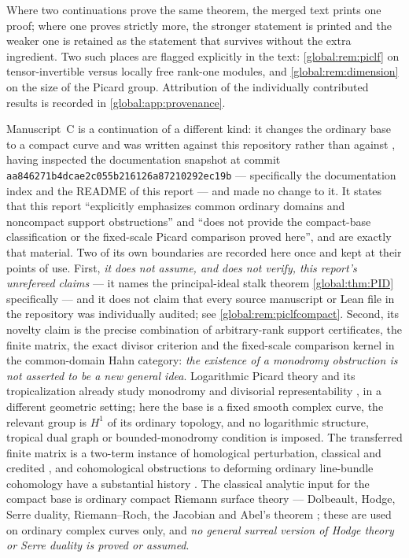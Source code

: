 \documentclass[11pt,letterpaper]{article}
\theoremstyle{definition}
\theoremstyle{remark}
\numberwithin{equation}{section}
\begin{document}
Where two continuations prove the same theorem, the merged text prints one proof; where one proves strictly more, the stronger statement is printed and the weaker one is retained as the statement that survives without the extra ingredient. Two such places are flagged explicitly in the text: \cref{global:rem:piclf} on tensor-invertible versus locally free rank-one modules, and \cref{global:rem:dimension} on the size of the Picard group. Attribution of the individually contributed results is recorded in \cref{global:app:provenance}.

Manuscript~C is a continuation of a different kind: it changes the ordinary base to a compact curve and was written against this repository rather than against \cite{Source}, having inspected the documentation snapshot at commit
\texttt{aa846271\allowbreak b4dcae2c\allowbreak 055b2161\allowbreak 26a87210\allowbreak 292ec19b}
--- specifically the documentation index and the README of this report --- and made no change to it. It states that this report ``explicitly emphasizes common ordinary domains and noncompact support obstructions'' and ``does not provide the compact-base classification or the fixed-scale Picard comparison proved here'', and  are exactly that material. Two of its own boundaries are recorded here once and kept at their points of use. First, \emph{it does not assume, and does not verify, this report's unrefereed claims} --- it names the principal-ideal stalk theorem \cref{global:thm:PID} specifically --- and it does not claim that every source manuscript or Lean file in the repository was individually audited; see \cref{global:rem:piclfcompact}. Second, its novelty claim is the precise combination of arbitrary-rank support certificates, the finite matrix, the exact divisor criterion and the fixed-scale comparison kernel in the common-domain Hahn category: \emph{the existence of a monodromy obstruction is not asserted to be a new general idea}. Logarithmic Picard theory and its tropicalization already study monodromy and divisorial representability \cite{MW}, in a different geometric setting; here the base is a fixed smooth complex curve, the relevant group is $H^1$ of its ordinary topology, and no logarithmic structure, tropical dual graph or bounded-monodromy condition is imposed. The transferred finite matrix is a two-term instance of homological perturbation, classical and credited \cite{Crainic}, and cohomological obstructions to deforming ordinary line-bundle cohomology have a substantial history \cite{GL}. The classical analytic input for the compact base is ordinary compact Riemann surface theory --- Dolbeault, Hodge, Serre duality, Riemann--Roch, the Jacobian and Abel's theorem \cite{Narasimhan}; these are used on ordinary complex curves only, and \emph{no general surreal version of Hodge theory or Serre duality is proved or assumed}.
\end{document}
